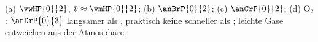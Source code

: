 (a) $\vwHP{0}{2}$, $\bar v \approx \vmHP{0}{2}$; (b) $\anBrP{0}{2}$; (c) $\anCrP{0}{2}$; (d) $\mathrm{O_2}$: $\anDrP{0}{3}$ langsamer als \vgAO, praktisch keine schneller als \vgBO; leichte Gase entweichen aus der Atmosphäre.
